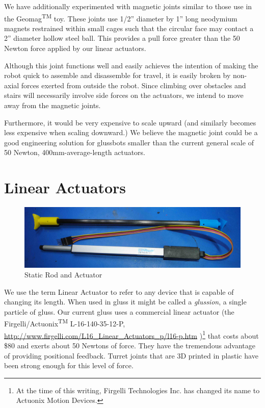 \documentclass[11pt]{article}
\begin{document}
We have additionally experimented with magnetic joints similar to those use in the Geomag\textsuperscript{TM} toy.
These joints use 1/2'' diameter by 1'' long neodymium magnets restrained within small cages such that the circular face
may contact a 2'' diameter hollow steel ball.  This provides a pull force greater than the 50 Newton force applied by our linear
actuators.

Although this joint functions well and easily achieves the intention of making the robot quick to assemble and
disassemble for travel,
it is easily broken by non-axial forces exerted from outside the robot.
Since climbing over obstacles and stairs will necessarily involve side forces on the actuators,
we intend to move away from the magnetic joints.

Furthermore, it would be very expensive to scale upward (and similarly becomes less expensive when
scaling downward.) We believe the magnetic joint could be a good engineering solution for glussbots smaller than the current
general scale of 50 Newton, 400mm-average-length actuators.


\section{Linear Actuators}
\label{linearactuators}

\begin{figure}[!ht]
  \centering
    \includegraphics[width=1.0\textwidth]{figureslowres/CarbonFiberAndActuator.jpg}
    \caption[Static Rod and Actuator]{Static Rod and Actuator}
      \label{rodAndActuator}
\end{figure}

We use the term Linear Actuator to refer to any device that is capable of changing its length. When
used in gluss it might be called a \emph{glussion}, a single particle of gluss. Our current gluss
uses a commercial linear actuator (the Firgelli/Actuonix\textsuperscript{TM} L-16-140-35-12-P,
\url{http://www.firgelli.com/L16_Linear_Actuators_p/l16-p.htm}
)\footnote{At the time of this writing, Firgelli Technologies Inc. has changed its name to Actuonix Motion Devices.}
that costs about \$80 and exerts about 50 Newtons of force.
They have the tremendous advantage
of providing positional feedback.
Turret joints that are 3D printed in plastic have been strong enough for this level of force.
\end{document}
